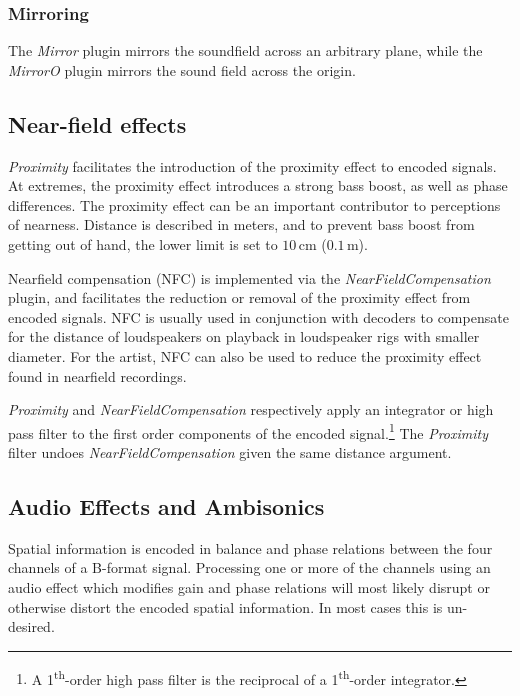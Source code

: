 \documentclass{article}
\begin{document}
\subsubsection{Mirroring}\label{sec:mirror}

The \emph{Mirror} plugin mirrors the soundfield across an arbitrary plane, while the \emph{MirrorO} plugin mirrors the sound field across the origin.



\subsection{Near-field effects}\label{sec:near-field}

\emph{Proximity} facilitates the introduction of the proximity effect to encoded signals.
At extremes, the proximity effect introduces a strong bass boost, as well as phase differences.
The proximity effect can be an important contributor to perceptions of nearness.
Distance is described in meters, and to prevent bass boost from getting out of hand, the lower limit is set to $10\,\mathrm{cm}$ ($0.1\,\mathrm{m}$).

Near\-field compensation (NFC) is implemented via the \emph{NearFieldCompensation} plugin, and facilitates the reduction or removal of the proximity effect from encoded signals.
NFC is usually used in conjunction with decoders to compensate for the distance of loudspeakers on playback in loudspeaker rigs with smaller diameter. For the artist, NFC can also be used to reduce the proximity effect found in nearfield recordings.

\emph{Proximity} and \emph{NearFieldCompensation} respectively apply an integrator or high pass filter to the first order components of the encoded signal.\footnote{A 1\textsuperscript{th}-order high pass filter is the reciprocal of a 1\textsuperscript{th}-order integrator.} The \emph{Proximity} filter undoes \emph{NearFieldCompensation} given the same distance argument.


\subsection{Audio Effects and Ambisonics}\label{sec:a-format}

Spatial information is encoded in balance and phase relations between the four channels of a B-format signal.
Processing one or more of the channels using an audio effect which modifies gain and phase relations will most likely disrupt or otherwise distort the encoded spatial information. In most cases this is un-desired.
\end{document}

